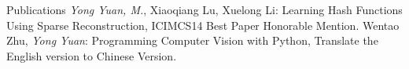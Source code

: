 
\begin{rubric}{Publications}
		\emph{Yong Yuan, M.}, Xiaoqiang Lu, Xuelong Li:
		Learning Hash Functions Using Sparse Reconstruction,
		ICIMCS14 Best Paper Honorable Mention.
		Wentao Zhu, \emph{Yong Yuan}:
		Programming Computer Vision with Python,
		Translate the English version to Chinese Version.
\end{rubric}
